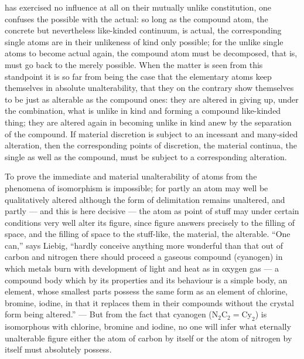 \documentclass[12pt,a4paper]{book}
\begin{document}
has exercised no influence at all on their mutually unlike constitution, one
confuses the possible with the actual: so long as the compound atom, the
concrete but nevertheless like-kinded continuum, is actual, the corresponding
single atoms are in their unlikeness of kind only possible; for the unlike
single atoms to become actual again, the compound atom must be decomposed,
that is, must go back to the merely possible. When the matter is seen from this
standpoint it is so far from being the case that the elementary atoms keep
themselves in absolute unalterability, that they on the contrary show
themselves to be just as alterable as the compound ones: they are altered in
giving up, under the combination, what is unlike in kind and forming a compound
like-kinded thing; they are altered again in becoming unlike in kind anew by
the separation of the compound. If material discretion is subject to an
incessant and many-sided alteration, then the corresponding points of
discretion, the material continua, the single as well as the compound, must be
subject to a corresponding alteration.

To prove the immediate and material unalterability of atoms from the phenomena
of isomorphism is impossible; for partly an atom may well be qualitatively
altered although the form of delimitation remains unaltered, and partly --- and
this is here decisive --- the atom as point of stuff may under certain
conditions very well alter its figure, since figure answers precisely to the
filling of space, and the filling of space to the stuff-like, the material, the
alterable. ``One can,'' says Liebig, ``hardly conceive anything more wonderful
than that out of carbon and nitrogen there should proceed a gaseous compound
(cyanogen) in which metals burn with development of light and heat as in oxygen
gas --- a compound body which by its properties and its behaviour is a simple
body, an element, whose smallest parts possess the same form as an element of
chlorine, bromine, iodine, in that it replaces them in their compounds without
the crystal form being altered.'' --- But from the fact that cyanogen
($\mathrm{N}_2\mathrm{C}_2 = \mathrm{Cy}_2$) is isomorphous with chlorine,
bromine and iodine, no one will infer what eternally unalterable figure either
the atom of carbon by itself or the atom of nitrogen by itself must absolutely
possess.
\end{document}
